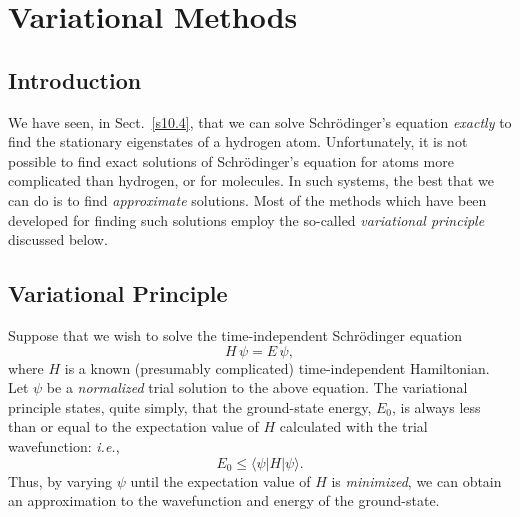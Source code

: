 \chapter{Variational Methods}\label{s14} 
\section{Introduction}
We have seen, in Sect.~\ref{s10.4}, that we can solve Schr\"{o}dinger's equation {\em exactly}\/ to find the stationary eigenstates
of a hydrogen atom. Unfortunately, it is not possible to find exact
solutions of Schr\"{o}dinger's equation for atoms more complicated than hydrogen, or for molecules. In such systems, the best that we can do
is to find {\em approximate}\/ solutions. Most of the methods which have been developed for finding such solutions employ the so-called {\em variational
principle}\/ discussed below.

\section{Variational Principle}
Suppose that we wish to solve the time-independent Schr\"{o}dinger equation
\begin{equation}
H\,\psi = E\,\psi,
\end{equation}
where $H$ is a known (presumably complicated) time-independent Hamiltonian. Let $\psi$ be a {\em normalized}\/ trial solution to the above equation.
The variational principle states, quite simply, that the
ground-state energy, $E_0$, is always less than or equal to the expectation
value of $H$ calculated with the trial wavefunction: {\em i.e.},
\begin{equation}
E_0 \leq \langle\psi|H|\psi\rangle.
\end{equation}
Thus, by varying $\psi$ until the expectation value of $H$ is {\em minimized}, we can
obtain  an approximation to the wavefunction and energy of the ground-state.

